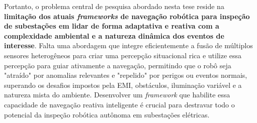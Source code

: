 Portanto, o problema central de pesquisa abordado nesta tese reside na \textbf{limitação dos atuais \textit{frameworks} de navegação robótica para inspeção de subestações em lidar de forma adaptativa e reativa com a complexidade ambiental e a natureza dinâmica dos eventos de interesse}. Falta uma abordagem que integre eficientemente a fusão de múltiplos sensores heterogêneos para criar uma percepção situacional rica e utilize essa percepção para guiar ativamente a navegação, permitindo que o robô seja "atraído" por anomalias relevantes e "repelido" por perigos ou eventos normais, superando os desafios impostos pela \ac{EMI}, obstáculos, iluminação variável e a natureza mista do ambiente. Desenvolver um \textit{framework} que habilite essa capacidade de navegação reativa inteligente é crucial para destravar todo o potencial da inspeção robótica autônoma em subestações elétricas.

